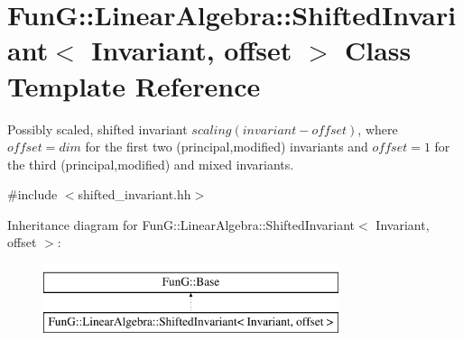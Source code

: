 \hypertarget{classFunG_1_1LinearAlgebra_1_1ShiftedInvariant}{\section{Fun\-G\-:\-:Linear\-Algebra\-:\-:Shifted\-Invariant$<$ Invariant, offset $>$ Class Template Reference}
\label{classFunG_1_1LinearAlgebra_1_1ShiftedInvariant}
}


Possibly scaled, shifted invariant $scaling (invariant - offset)$, where $offset = dim$ for the first two (principal,modified) invariants and $offset = 1$ for the third (principal,modified) and mixed invariants.  




{\ttfamily \#include $<$shifted\-\_\-invariant.\-hh$>$}

Inheritance diagram for Fun\-G\-:\-:Linear\-Algebra\-:\-:Shifted\-Invariant$<$ Invariant, offset $>$\-:\begin{figure}[H]
\begin{center}
\leavevmode
\includegraphics[height=2.000000cm]{classFunG_1_1LinearAlgebra_1_1ShiftedInvariant}
\end{center}
\end{figure}
